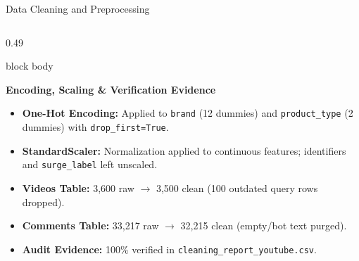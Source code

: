 \documentclass[aspectratio=169, 10pt]{beamer}
\newenvironment{card}[1][]{%
    \begin{beamercolorbox}[rounded=true,shadow=false,wd=\linewidth,sep=4pt,#1]{block body}%
}{%
    \end{beamercolorbox}%
}
\begin{document}
\begin{frame}{Data Cleaning and Preprocessing}
\begin{columns}[T]
        \begin{column}{0.49\textwidth}
            \begin{card}
                {\fontsize{8.5pt}{10pt}\selectfont \textbf{\color{NavyPrimary}Encoding, Scaling \& Verification Evidence}}\\[0.08cm]
                \begin{itemize}\setlength{\itemsep}{2pt}
                    \item \textbf{One-Hot Encoding:} Applied to \texttt{brand} (12 dummies) and \texttt{product\_type} (2 dummies) with \texttt{drop\_first=True}.
                    \item \textbf{StandardScaler:} Normalization applied to continuous features; identifiers and \texttt{surge\_label} left unscaled.
                    \item \textbf{Videos Table:} 3,600 raw $\rightarrow$ 3,500 clean (100 outdated query rows dropped).
                    \item \textbf{Comments Table:} 33,217 raw $\rightarrow$ 32,215 clean (empty/bot text purged).
                    \item \textbf{Audit Evidence:} 100\% verified in \texttt{cleaning\_report\_youtube.csv}.
                \end{itemize}
            \end{card}
        \end{column}
    \end{columns}
\end{frame}
\end{document}
